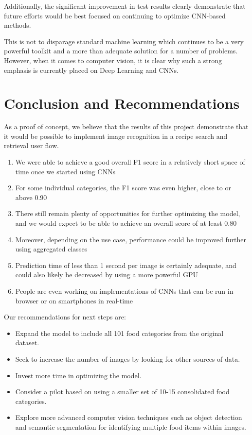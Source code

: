 \documentclass[10pt,a4paper]{article}
\begin{document}
Additionally, the significant improvement in test results clearly demonstrate that future efforts would be best focused on continuing to optimize CNN-based methods.

This is not to disparage standard machine learning which continues to be a very powerful toolkit and a more than adequate solution for a number of problems. However, when it comes to computer vision, it is clear why such a strong emphasis is currently placed on Deep Learning and CNNs.

\section{Conclusion and Recommendations}

As a proof of concept, we believe that the results of this project demonstrate that it would be possible to implement image recognition in a recipe search and retrieval user flow.

\begin{enumerate}
\item We were able to achieve a good overall F1 score in a relatively short space of time once we started using CNNs
\item For some individual categories, the F1 score was even higher, close to or above 0.90
\item There still remain plenty of opportunities for further optimizing the model, and we would expect to be able to achieve an overall score of at least 0.80
\item Moreover, depending on the use case, performance could be improved further using aggregated classes
\item Prediction time of less than 1 second per image is certainly adequate, and could also likely be decreased by using a more powerful GPU
\item People are even working on implementations of CNNs that can be run in-browser or on smartphones in real-time
\end{enumerate}

Our recommendations for next steps are:

\begin{itemize}
\item Expand the model to include all 101 food categories from the original dataset.
\item Seek to increase the number of images by looking for other sources of data.
\item Invest more time in optimizing the model.
\item Consider a pilot based on using a smaller set of 10-15 consolidated food categories.
\item Explore more advanced computer vision techniques such as object detection and semantic segmentation for identifying multiple food items within images.
\end{itemize}
\end{document}
